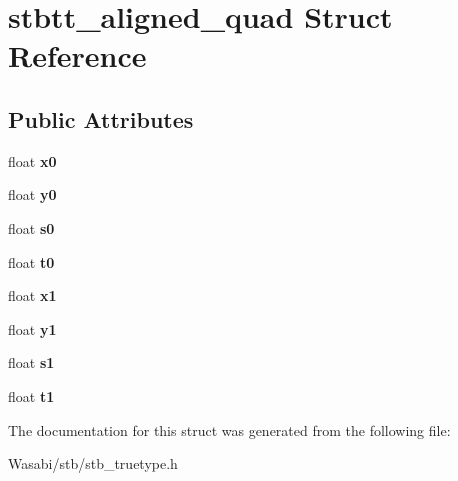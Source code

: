 \hypertarget{structstbtt__aligned__quad}{}\section{stbtt\+\_\+aligned\+\_\+quad Struct Reference}
\label{structstbtt__aligned__quad}
\subsection*{Public Attributes}
\begin{DoxyCompactItemize}
\item 
float {\bfseries x0}\hypertarget{structstbtt__aligned__quad_ad74fd8fd69f8a8e1bd20cb0ab7df6e2e}{}\label{structstbtt__aligned__quad_ad74fd8fd69f8a8e1bd20cb0ab7df6e2e}

\item 
float {\bfseries y0}\hypertarget{structstbtt__aligned__quad_a6178a6b380cf6889893afaeb5019ecd6}{}\label{structstbtt__aligned__quad_a6178a6b380cf6889893afaeb5019ecd6}

\item 
float {\bfseries s0}\hypertarget{structstbtt__aligned__quad_ac23b153ff4042deb5499e5a8cacf4a59}{}\label{structstbtt__aligned__quad_ac23b153ff4042deb5499e5a8cacf4a59}

\item 
float {\bfseries t0}\hypertarget{structstbtt__aligned__quad_a921cd13638a8b3a1e0729021d371da49}{}\label{structstbtt__aligned__quad_a921cd13638a8b3a1e0729021d371da49}

\item 
float {\bfseries x1}\hypertarget{structstbtt__aligned__quad_a43a7eeac24238e289f825e644331dee6}{}\label{structstbtt__aligned__quad_a43a7eeac24238e289f825e644331dee6}

\item 
float {\bfseries y1}\hypertarget{structstbtt__aligned__quad_a66ee8061da982804073a3d2a9114e53c}{}\label{structstbtt__aligned__quad_a66ee8061da982804073a3d2a9114e53c}

\item 
float {\bfseries s1}\hypertarget{structstbtt__aligned__quad_a26360efee3cdfb5aa2bdc593157b436b}{}\label{structstbtt__aligned__quad_a26360efee3cdfb5aa2bdc593157b436b}

\item 
float {\bfseries t1}\hypertarget{structstbtt__aligned__quad_ae1f5ed7333ca5bba46c6a098a05ac75b}{}\label{structstbtt__aligned__quad_ae1f5ed7333ca5bba46c6a098a05ac75b}

\end{DoxyCompactItemize}


The documentation for this struct was generated from the following file\+:\begin{DoxyCompactItemize}
\item 
Wasabi/stb/stb\+\_\+truetype.\+h\end{DoxyCompactItemize}
